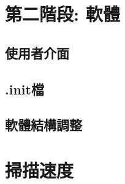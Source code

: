 \documentclass[12pt]{article}
\begin{document}
    \section{第二階段: 軟體}
    \subsection{使用者介面}
    \subsection{.init檔}
    \subsection{軟體結構調整}
    
    \section{掃描速度}
\end{document}
